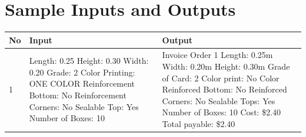 \documentclass[12pt]{article}
\begin{document}
\section{Sample Inputs and Outputs}
\begin{tabular}{| p{1cm} | p{6cm} | p{6cm} |}
	\hline
	\textbf{No} & \textbf{Input} & \textbf{Output} \\ \hline
	1 & Length: 0.25\newline
	Height: 0.30\newline
	Width: 0.20\newline
	Grade: 2\newline
	Color Printing: ONE COLOR\newline
	Reinforcement Bottom: No\newline
	Reinforcement Corners: No\newline
	Sealable Top: Yes\newline
	Number of Boxes: 10 & Invoice\newline
	\newline
	Order 1\newline
	Length: 0.25m\newline
	Width: 0.20m\newline
	Height: 0.30m\newline
	Grade of Card: 2\newline
	Color print: No Color\newline
	Reinforced Bottom: No\newline
	Reinforced Corners: No\newline
	Sealable Tops: Yes\newline
	Number of Boxes: 10\newline
	Cost: \$2.40\newline
	\newline
	Total payable: \$2.40\\ \hline


\end{tabular}
\end{document}

